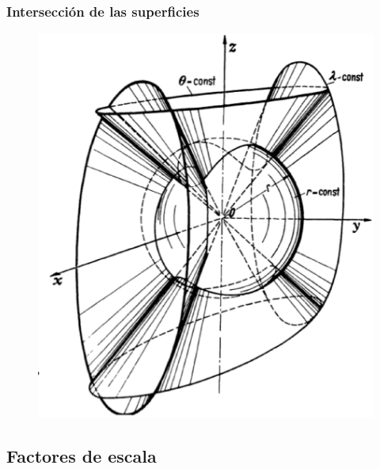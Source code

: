 \documentclass[12pt]{beamer}
\begin{document}
\begin{frame}
\frametitle{Intersección de las superficies}
\begin{figure}
  \centering
  \includegraphics[scale=0.3]{Imagenes/Sistema_Conico.eps}
\end{figure}
\end{frame}

\subsection{Factores de escala}
\end{document}
